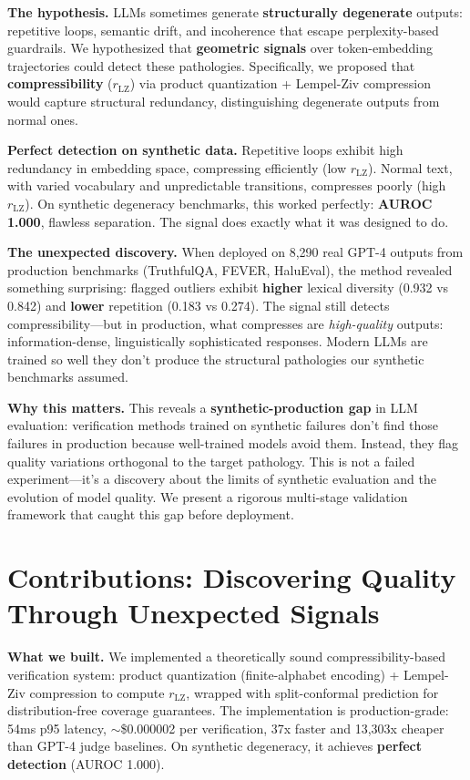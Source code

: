 \documentclass[11pt]{article}
\begin{document}
\textbf{The hypothesis.} LLMs sometimes generate \textbf{structurally degenerate} outputs: repetitive loops, semantic drift, and incoherence that escape perplexity-based guardrails. We hypothesized that \textbf{geometric signals} over token-embedding trajectories could detect these pathologies. Specifically, we proposed that \textbf{compressibility} ($r_{\text{LZ}}$) via product quantization + Lempel-Ziv compression would capture structural redundancy, distinguishing degenerate outputs from normal ones.

\textbf{Perfect detection on synthetic data.} Repetitive loops exhibit high redundancy in embedding space, compressing efficiently (low $r_{\text{LZ}}$). Normal text, with varied vocabulary and unpredictable transitions, compresses poorly (high $r_{\text{LZ}}$). On synthetic degeneracy benchmarks, this worked perfectly: \textbf{AUROC 1.000}, flawless separation. The signal does exactly what it was designed to do.

\textbf{The unexpected discovery.} When deployed on 8,290 real GPT-4 outputs from production benchmarks (TruthfulQA, FEVER, HaluEval), the method revealed something surprising: flagged outliers exhibit \textbf{higher} lexical diversity (0.932 vs 0.842) and \textbf{lower} repetition (0.183 vs 0.274). The signal still detects compressibility---but in production, what compresses are \textit{high-quality} outputs: information-dense, linguistically sophisticated responses. Modern LLMs are trained so well they don't produce the structural pathologies our synthetic benchmarks assumed.

\textbf{Why this matters.} This reveals a \textbf{synthetic-production gap} in LLM evaluation: verification methods trained on synthetic failures don't find those failures in production because well-trained models avoid them. Instead, they flag quality variations orthogonal to the target pathology. This is not a failed experiment---it's a discovery about the limits of synthetic evaluation and the evolution of model quality. We present a rigorous multi-stage validation framework that caught this gap before deployment.

\section{Contributions: Discovering Quality Through Unexpected Signals}
\label{sec:contributions}

\textbf{What we built.} We implemented a theoretically sound compressibility-based verification system: product quantization (finite-alphabet encoding) + Lempel-Ziv compression to compute $r_{\text{LZ}}$, wrapped with split-conformal prediction for distribution-free coverage guarantees. The implementation is production-grade: 54ms p95 latency, $\sim$\$0.000002 per verification, 37x faster and 13,303x cheaper than GPT-4 judge baselines. On synthetic degeneracy, it achieves \textbf{perfect detection} (AUROC 1.000).
\end{document}
